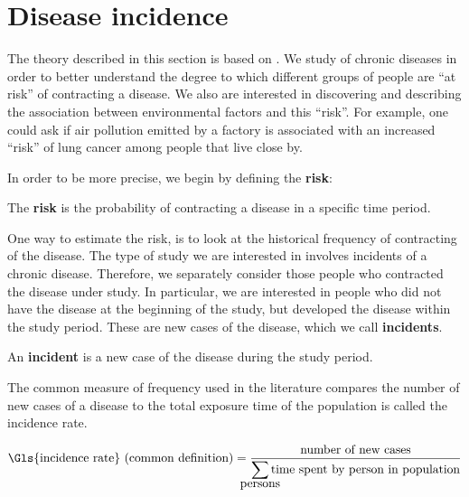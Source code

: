 

%
%
\section{Disease incidence}
\label{sec:theory:incidence}

The theory described in this section is based on \citet{rothman2008modern}.
We study of chronic diseases in order to better understand the degree to which different groups of people are ``at risk'' of contracting a disease.
We also are interested in discovering and describing the association between environmental factors and this ``risk''.
For example, one could ask if air pollution emitted by a factory is associated with an increased ``risk'' of lung cancer among people that live close by.

In order to be more precise, we begin by defining the \textbf{risk}:

\begin{defn}
    The \textbf{risk} is the probability of contracting a disease in a specific time period.
\end{defn}

One way to estimate the risk, is to look at the historical frequency of contracting of the disease.
The type of study we are interested in involves incidents of a chronic disease.
Therefore, we separately consider those people who contracted the disease under study.
In particular, we are interested in people who did not have the disease at the beginning of the study,
but developed the disease within the study period.
These are new cases of the disease, which we call \textbf{incidents}.

\begin{defn}
    An \textbf{\gls{incident}} is a new case of the disease during the study period.
\end{defn}

The common measure of frequency used in the literature compares the number of new cases of a disease to the total exposure time of the population is called the \gls{incidence rate}.

\begin{equation}
    \mbox{\Gls{incidence rate} (common definition)} = \frac{\mbox{number of new cases}}
                                {\displaystyle\smashoperator{\sum\limits_{\mbox{persons}}}\mbox{time spent by person in population}}
\end{equation}

